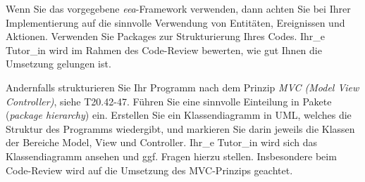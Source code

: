 Wenn Sie das vorgegebene \emph{eea}-Framework verwenden, dann achten Sie bei Ihrer Implementierung auf die sinnvolle Verwendung von Entitäten, Ereignissen und Aktionen. Verwenden Sie Packages zur Strukturierung Ihres Codes. Ihr\_e Tutor\_in wird im Rahmen des Code-Review bewerten, wie gut Ihnen die Umsetzung gelungen ist.

Andernfalls strukturieren Sie Ihr Programm nach dem Prinzip \emph{MVC (\glqq Model View Controller\grqq)}, siehe T20.42-47. F\"uhren Sie eine sinnvolle Einteilung in Pakete (\emph{package hierarchy}) ein. Erstellen Sie ein Klassendiagramm in UML, welches die Struktur des Programms wiedergibt, und markieren Sie darin jeweils die Klassen der Bereiche Model, View
und Controller. Ihr\_e Tutor\_in wird sich das Klassendiagramm ansehen und ggf. Fragen hierzu stellen. Insbesondere beim Code-Review wird auf die Umsetzung des MVC-Prinzips geachtet.
